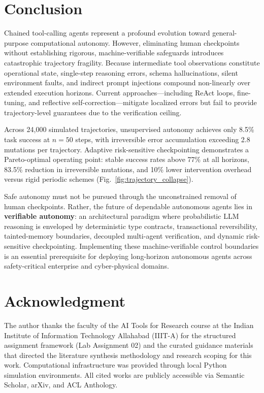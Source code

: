 \documentclass[conference]{IEEEtran}
\begin{document}
\section{Conclusion}
Chained tool-calling agents represent a profound evolution toward general-purpose computational autonomy. However, eliminating human checkpoints without establishing rigorous, machine-verifiable safeguards introduces catastrophic trajectory fragility. Because intermediate tool observations constitute operational state, single-step reasoning errors, schema hallucinations, silent environment faults, and indirect prompt injections compound non-linearly over extended execution horizons. Current approaches---including ReAct loops, fine-tuning, and reflective self-correction---mitigate localized errors but fail to provide trajectory-level guarantees due to the verification ceiling.

Across 24,000 simulated trajectories, unsupervised autonomy achieves only 8.5\% task success at $n=50$ steps, with irreversible error accumulation exceeding 2.8 mutations per trajectory. Adaptive risk-sensitive checkpointing demonstrates a Pareto-optimal operating point: stable success rates above 77\% at all horizons, 83.5\% reduction in irreversible mutations, and 10\% lower intervention overhead versus rigid periodic schemes (Fig.~\ref{fig:trajectory_collapse}).

Safe autonomy must not be pursued through the unconstrained removal of human checkpoints. Rather, the future of dependable autonomous agents lies in \textbf{verifiable autonomy}: an architectural paradigm where probabilistic LLM reasoning is enveloped by deterministic type contracts, transactional reversibility, tainted-memory boundaries, decoupled multi-agent verification, and dynamic risk-sensitive checkpointing. Implementing these machine-verifiable control boundaries is an essential prerequisite for deploying long-horizon autonomous agents across safety-critical enterprise and cyber-physical domains.

\section*{Acknowledgment}
The author thanks the faculty of the AI Tools for Research course at the Indian Institute of Information Technology Allahabad (IIIT-A) for the structured assignment framework (Lab Assignment 02) and the curated guidance materials that directed the literature synthesis methodology and research scoping for this work. Computational infrastructure was provided through local Python simulation environments. All cited works are publicly accessible via Semantic Scholar, arXiv, and ACL Anthology.



\end{document}
